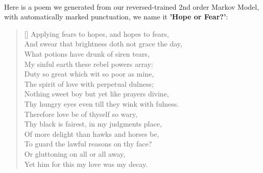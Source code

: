 \paragraph{}
Here is a poem we generated from our reversed-trained 2nd order Markov Model, with automatically marked punctuation, we name it \textbf{'Hope or Fear?'}:
\renewcommand{\poemtoc}{subsection}
\settowidth{\versewidth}{Thy proud hearts slave and vassal wretch to be?}
\begin{verse}[\versewidth]
Applying fears to hopes, and hopes to fears,\\
And swear that brightness doth not grace the day,\\
What potions have drunk of siren tears,\\
My sinful earth these rebel powers array:\\
\vspace{5pt}
Duty so great which wit so poor as mine,\\
The spirit of love with perpetual dulness;\\
Nothing sweet boy but yet like prayers divine,\\
Thy hungry eyes even till they wink with fulness.\\
\vspace{5pt}
Therefore love be of thyself so wary,\\
Thy black is fairest, in my judgments place,\\
Of more delight than hawks and horses be,\\
To guard the lawful reasons on thy face?\\
\vspace{5pt}
\vin  Or gluttoning on all or all away,\\
\vin  Yet him for this my love was my decay.\\
\end{verse}


